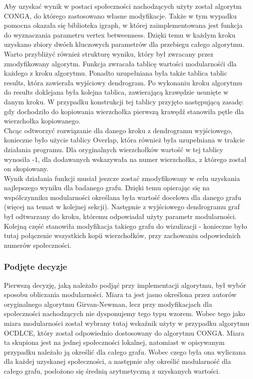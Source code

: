 \documentclass{article}
\begin{document}
Aby uzyskać wynik w postaci społeczności nachodzących użyty został algorytm CONGA, do którego zastosowano własne modyfikacje. Także w tym wypadku pomocna okazała się biblioteka igraph, w której zaimplementowana jest funkcja do wyznaczania parametru vertex betweenness. Dzięki temu w każdym kroku uzyskano zbiory dwóch kluczowych parametrów dla przebiegu całego algorytmu.\\

Warto przybliżyć również strukturę wyniku, który był zwracany przez zmodyfikowany algorytm. Funkcja zwracała tablicę wartości modularnośći dla każdego z kroku algorytmu. Ponadto uzupełniana była także tablica tablic results, która zawierała wyjściowy dendrogram. Po wykonaniu kroku algorytmu do results doklejana była kolejna tablica, zawierającą krawędzie usunięte w danym kroku. W przypadku konstrukcji tej tablicy przyjęto następującą zasadę: gdy dochodziło do kopiowania wierzchołka pierwszą krawędź stanowiła pętle dla wierzchołka kopiowanego.\\

Chcąc odtworzyć rozwiązanie dla danego kroku z dendrogramu wyjściowego, konieczne było użycie tablicy Overlap, która również była uzupełniana w trakcie działania programu. Dla oryginalnych wierzchołków wartość w tej tablicy wynosiła -1, dla dodawanych wskazywała na numer wierzchołka, z którego został on skopiowany.\\

Wynik działania funkcji musiał jeszcze zostać zmodyfikowany w celu uzyskania najlepszego wyniku dla badanego grafu. Dzięki temu opierając się na współczynniku modularności określana była wartość docelowa dla danego grafu (więcej na temat w kolejnej sekcji). Następnie z wyjściowego dendrogramu graf był odtwarzany do kroku, któremu odpowiadał użyty parametr modularności. Kolejną część stanowiła modyfikacja takiego grafu do wizulizacji - konieczne było tutaj połączenie wszystkich kopii wierzchołków, przy zachowaniu odpowiednich numerów społeczności.

\subsubsection{Podjęte decyzje}
Pierwszą decyzję, jaką należało podjąć przy implementacji algorytmu, był wybór sposobu obliczania modularności. Miara ta jest jasno określona przez autorów oryginalnego algorytmu Girvan-Newman, lecz przy modyfikacjach dla społeczności nachodzących nie dysponujemy tego typu wzorem. Wobec tego jako miara modularności został wybrany tutaj wskaźnik użyty w przypadku algorytmu OCDLCE, który został odpowiednio dostosowany do algorytmu CONGA. Miara ta skupiona jest na jednej społeczności lokalnej, natomiast w opisywanym przypadku należało ją określić dla całego grafu. Wobec czego była ona wyliczana dla każdej uzyskanej społeczności, a następnie aby określić modularność dla całego grafu, posłożono się średnią arytmetyczną z uzyskanych wartości. \\
\end{document}
